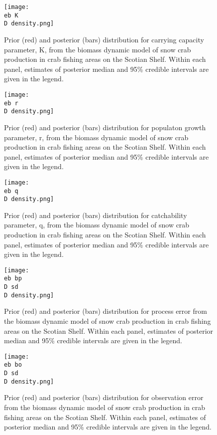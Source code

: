 \documentclass[11pt]{article}
\newcommand{\D}{.}
\newcommand{\eb}{bio/snowcrab/assessments/2014/figures/bugs/survey/}
\begin{document}
\begin{figure}
    
    \texttt{[image: \\eb K\\D density.png]}
    \caption{Prior (red) and posterior (bars) distribution for carrying capacity parameter, K, from the biomass dynamic model of snow crab production in crab fishing areas on the Scotian Shelf. Within each panel, estimates of posterior median and 95\% credible intervals are given in the legend.}
  
\end{figure}
\clearpage

\begin{figure}
    
    \texttt{[image: \\eb r\\D density.png]}
    \caption{Prior (red) and posterior (bars) distribution for populaton growth parameter, r, from the biomass dynamic model of snow crab production in crab fishing areas on the Scotian Shelf. Within each panel, estimates of posterior median and 95\% credible intervals are given in the legend.}
  
\end{figure}
\clearpage

\begin{figure}
    
    \texttt{[image: \\eb q\\D density.png]}
    \caption{Prior (red) and posterior (bars) distribution for catchability parameter, q, from the biomass dynamic model of snow crab production in crab fishing areas on the Scotian Shelf. Within each panel, estimates of posterior median and 95\% credible intervals are given in the legend.}
  
\end{figure}
\clearpage



\begin{figure}
    
    \texttt{[image: \\eb bp\\D sd\\D density.png]}
    \caption{Prior (red) and posterior (bars) distribution for process error from the biomass dynamic model of snow crab production in crab fishing areas on the Scotian Shelf. Within each panel, estimates of posterior median and 95\% credible intervals are given in the legend.}
  
\end{figure}
\clearpage

\begin{figure}
    
    \texttt{[image: \\eb bo\\D sd\\D density.png]}
    \caption{Prior (red) and posterior (bars) distribution for observation error from the biomass dynamic model of snow crab production in crab fishing areas on the Scotian Shelf. Within each panel, estimates of posterior median and 95\% credible intervals are given in the legend.}
  
\end{figure}
\clearpage
\end{document}

